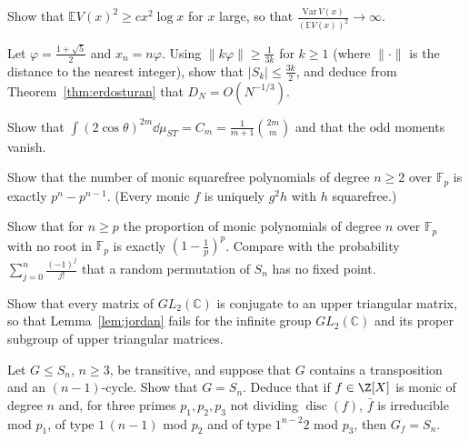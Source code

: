 \begin{exercise}[$\star\star\star$]\label{ex:varV}
Show that $\mathbb EV(x)^2\ge cx^2\log x$ for $x$ large, so that $\frac{\mathrm{Var}\,V(x)}{(\mathbb EV(x))^2}\to\infty$.
\end{exercise}

\begin{exercise}[$\star\star$]\label{ex:golden}
Let $\varphi=\frac{1+\sqrt5}2$ and $x_n=n\varphi$. Using $\|k\varphi\|\ge\frac1{3k}$ for $k\ge1$ (where $\|\cdot\|$ is the distance to the nearest integer), show that $|S_k|\le\frac{3k}2$, and deduce from Theorem~\ref{thm:erdosturan} that $D_N=O(N^{-1/3})$.
\end{exercise}

\begin{exercise}[$\star$]\label{ex:catalan}
Show that $\int(2\cos\theta)^{2m}\dd\mu_{ST}=C_m=\frac1{m+1}\binom{2m}m$ and that the odd moments vanish.
\end{exercise}

\begin{exercise}[$\star$]\label{ex:squarefreecount}
Show that the number of monic squarefree polynomials of degree $n\ge2$ over $\mathbb F_p$ is exactly $p^n-p^{n-1}$. (Every monic $f$ is uniquely $g^2h$ with $h$ squarefree.)
\end{exercise}

\begin{exercise}[$\star\star$]\label{ex:noroot}
Show that for $n\ge p$ the proportion of monic polynomials of degree $n$ over $\mathbb F_p$ with no root in $\mathbb F_p$ is exactly $(1-\frac1p)^p$. Compare with the probability $\sum_{j=0}^n\frac{(-1)^j}{j!}$ that a random permutation of $S_n$ has no fixed point.
\end{exercise}

\begin{exercise}[$\star$]\label{ex:jordaninfinite}
Show that every matrix of $GL_2(\mathbb C)$ is conjugate to an upper triangular matrix, so that Lemma~\ref{lem:jordan} fails for the infinite group $GL_2(\mathbb C)$ and its proper subgroup of upper triangular matrices.
\end{exercise}

\begin{exercise}[$\star\star$]\label{ex:snrecognize}
Let $G\le S_n$, $n\ge3$, be transitive, and suppose that $G$ contains a transposition and an $(n-1)$-cycle. Show that $G=S_n$. Deduce that if $f\in\Z[X]$ is monic of degree $n$ and, for three primes $p_1,p_2,p_3$ not dividing $\operatorname{disc}(f)$, $\bar f$ is irreducible mod $p_1$, of type $1\,(n-1)$ mod $p_2$ and of type $1^{n-2}2$ mod $p_3$, then $G_f=S_n$.
\end{exercise}

